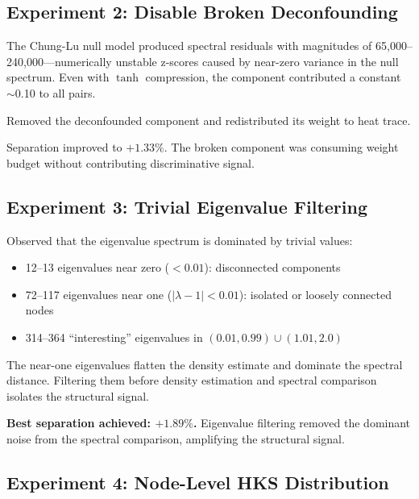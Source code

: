 \documentclass{../yalumba}
\begin{document}
\subsection{Experiment 2: Disable Broken Deconfounding}

The Chung-Lu null model produced spectral residuals with magnitudes of
65{,}000--240{,}000---numerically unstable z-scores caused by near-zero
variance in the null spectrum.  Even with $\tanh$ compression, the component
contributed a constant $\sim$0.10 to all pairs.

Removed the deconfounded component and redistributed its weight to heat trace.

\begin{keyfinding}
Separation improved to $+1.33\%$.  The broken component was consuming weight
budget without contributing discriminative signal.
\end{keyfinding}

\subsection{Experiment 3: Trivial Eigenvalue Filtering}

Observed that the eigenvalue spectrum is dominated by trivial values:

\begin{itemize}
  \item 12--13 eigenvalues near zero ($< 0.01$): disconnected components
  \item 72--117 eigenvalues near one ($|{\lambda - 1}| < 0.01$): isolated or
    loosely connected nodes
  \item 314--364 ``interesting'' eigenvalues in $(0.01, 0.99) \cup (1.01, 2.0)$
\end{itemize}


The near-one eigenvalues flatten the density estimate and dominate the spectral
distance.  Filtering them before density estimation and spectral comparison
isolates the structural signal.

\begin{keyfinding}
\textbf{Best separation achieved: $+1.89\%$.}  Eigenvalue filtering removed
the dominant noise from the spectral comparison, amplifying the structural
signal.
\end{keyfinding}

\subsection{Experiment 4: Node-Level HKS Distribution}
\end{document}
